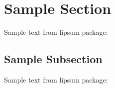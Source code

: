 \documentclass[bookType,partialBuild]{../../ThesisClass/ThesisClass}
\begin{document}
\section{Sample Section}
Sample text from lipsum package: \lipsum[5-13] 



\subsection{Sample Subsection}
Sample text from lipsum package: \lipsum[14-20] 



\ifdefined \partialBuild
	
	
\end{document}
